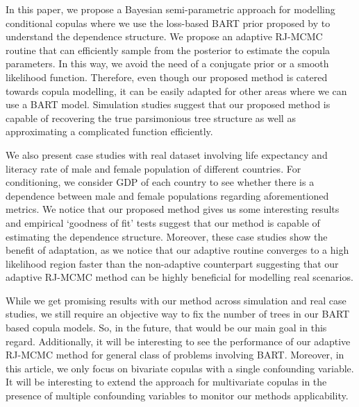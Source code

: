 \documentclass{amsart}
\begin{document}
In this paper, we propose a Bayesian semi-parametric approach for modelling conditional copulas where we use the loss-based BART prior proposed by \citet{serafini2024lossbasedpriortreetopologies} to understand the dependence structure. We propose an adaptive RJ-MCMC routine that can efficiently sample from the posterior to estimate the copula parameters. In this way, we avoid the need of a conjugate prior or a smooth likelihood function. Therefore, even though our proposed method is catered towards copula modelling, it can be easily adapted for other areas where we can use a BART model. Simulation studies suggest that our proposed method is capable of recovering the true parsimonious tree structure as well as approximating a complicated function efficiently. 

We also present case studies with real dataset involving life expectancy and literacy rate of male and female population of different countries. For conditioning, we consider GDP of each country to see whether there is a dependence between male and female populations regarding aforementioned metrics. We notice that our proposed method gives us some interesting results and empirical `goodness of fit' tests suggest that our method is capable of estimating the dependence structure. Moreover, these case studies show the benefit of adaptation, as we notice that our adaptive routine converges to a high likelihood region faster than the non-adaptive counterpart suggesting that our adaptive RJ-MCMC method can be highly beneficial for modelling real scenarios.

While we get promising results with our method across simulation and real case studies, we still require an objective way to fix the number of trees in our BART based copula models. So, in the future, that would be our main goal in this regard. Additionally, it will be interesting to see the performance of our adaptive RJ-MCMC method for general class of problems involving BART. Moreover, in this article, we only focus on bivariate copulas with a single confounding variable. It will be interesting to extend the approach for multivariate copulas in the presence of multiple confounding variables to monitor our methods applicability. 



\end{document}
